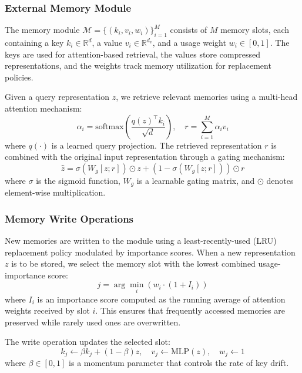 \documentclass[11pt]{article}
\begin{document}
\subsubsection{External Memory Module}

The memory module $\mathcal{M} = \{(k_i, v_i, w_i)\}_{i=1}^{M}$ consists of $M$ memory slots, each containing a key $k_i \in \mathbb{R}^d$, a value $v_i \in \mathbb{R}^{d_v}$, and a usage weight $w_i \in [0, 1]$. The keys are used for attention-based retrieval, the values store compressed representations, and the weights track memory utilization for replacement policies.

Given a query representation $z$, we retrieve relevant memories using a multi-head attention mechanism:
\begin{equation}
    \alpha_i = \text{softmax}\left(\frac{q(z)^\top k_i}{\sqrt{d}}\right), \quad r = \sum_{i=1}^{M} \alpha_i v_i
\end{equation}
where $q(\cdot)$ is a learned query projection. The retrieved representation $r$ is combined with the original input representation through a gating mechanism:
\begin{equation}
    \hat{z} = \sigma(W_g [z; r]) \odot z + (1 - \sigma(W_g [z; r])) \odot r
\end{equation}
where $\sigma$ is the sigmoid function, $W_g$ is a learnable gating matrix, and $\odot$ denotes element-wise multiplication.

\subsubsection{Memory Write Operations}

New memories are written to the module using a least-recently-used (LRU) replacement policy modulated by importance scores. When a new representation $z$ is to be stored, we select the memory slot with the lowest combined usage-importance score:
\begin{equation}
    j = \arg\min_i \left( w_i \cdot (1 + I_i) \right)
\end{equation}
where $I_i$ is an importance score computed as the running average of attention weights received by slot $i$. This ensures that frequently accessed memories are preserved while rarely used ones are overwritten.

The write operation updates the selected slot:
\begin{equation}
    k_j \leftarrow \beta k_j + (1 - \beta) z, \quad v_j \leftarrow \text{MLP}(z), \quad w_j \leftarrow 1
\end{equation}
where $\beta \in [0, 1]$ is a momentum parameter that controls the rate of key drift.
\end{document}
